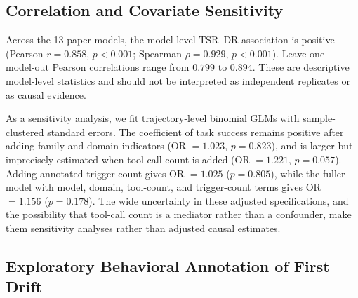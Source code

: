 \subsection{Correlation and Covariate Sensitivity}
\label{app:additional-correlation}

Across the 13 paper models, the model-level TSR--DR association is positive
(Pearson $r=0.858$, $p<0.001$; Spearman $\rho=0.929$, $p<0.001$).  Leave-one-
model-out Pearson correlations range from $0.799$ to $0.894$.  These are
descriptive model-level statistics and should not be interpreted as independent
replicates or as causal evidence.

As a sensitivity analysis, we fit trajectory-level binomial GLMs with
sample-clustered standard errors.  The coefficient of task success remains
positive after adding family and domain indicators (OR $=1.023$, $p=0.823$),
and is larger but imprecisely estimated when tool-call count is added (OR
$=1.221$, $p=0.057$).  Adding annotated trigger count gives OR $=1.025$
($p=0.805$), while the fuller model with model, domain, tool-count, and
trigger-count terms gives OR $=1.156$ ($p=0.178$).  The wide uncertainty in
these adjusted specifications, and the possibility that tool-call count is a
mediator rather than a confounder, make them sensitivity analyses rather than
adjusted causal estimates.

\begin{table}[t]
\centering
\small
\setlength{\tabcolsep}{3pt}
%
\caption{Trajectory-level sensitivity models for the success--drift association.
All models use sample-clustered standard errors.}
\label{tab:additional-glm}
\end{table}

\subsection{Exploratory Behavioral Annotation of First Drift}
\label{app:additional-behavior}

